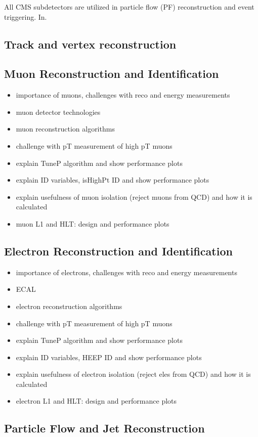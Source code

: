 All CMS subdetectors are utilized in particle flow (PF) reconstruction and event triggering.  In. 

\subsection{Track and vertex reconstruction}

\subsection{Muon Reconstruction and Identification}
\begin{itemize}
	\item importance of muons, challenges with reco and energy measurements
	\item muon detector technologies
	\item muon reconstruction algorithms
	\item challenge with pT measurement of high pT muons
	\item explain TuneP algorithm and show performance plots
	\item explain ID variables, isHighPt ID and show performance plots
	\item explain usefulness of muon isolation (reject muons from QCD) and how it is calculated
	\item muon L1 and HLT: design and performance plots
\end{itemize}

\subsection{Electron Reconstruction and Identification}
\begin{itemize}
	\item importance of electrons, challenges with reco and energy measurements
	\item ECAL
	\item electron reconstruction algorithms
	\item challenge with pT measurement of high pT muons
	\item explain TuneP algorithm and show performance plots
	\item explain ID variables, HEEP ID and show performance plots
	\item explain usefulness of electron isolation (reject eles from QCD) and how it is calculated
	\item electron L1 and HLT: design and performance plots
\end{itemize}



\subsection{Particle Flow and Jet Reconstruction}



